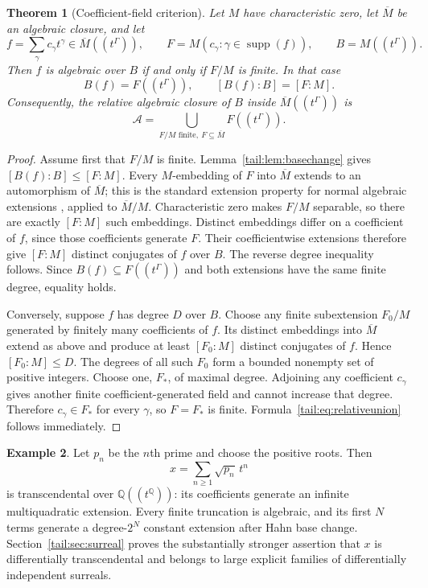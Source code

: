 \documentclass[11pt,a4paper]{article}
\numberwithin{equation}{section}
\newtheorem{theorem}{Theorem}[section]
\theoremstyle{definition}
\newtheorem{example}[theorem]{Example}
\theoremstyle{remark}
\newcommand{\Q}{\mathbb Q}
\newcommand{\supp}{\operatorname{supp}}
\begin{document}
\begin{theorem}[Coefficient-field criterion]\label{tail:thm:coefficient}
Let $M$ have characteristic zero, let $\overline M$ be an algebraic
closure, and let
\[
 f=\sum_\gamma c_\gamma t^\gamma\in\overline M((t^\Gamma)),
 \qquad F=M(c_\gamma:\gamma\in\supp(f)),
 \qquad B=M((t^\Gamma)).
\]
Then $f$ is algebraic over $B$ if and only if $F/M$ is finite. In that case
\begin{equation}\label{tail:eq:coeffdegree}
 B(f)=F((t^\Gamma)),\qquad [B(f):B]=[F:M].
\end{equation}
Consequently, the relative algebraic closure of $B$ inside
$\overline M((t^\Gamma))$ is
\begin{equation}\label{tail:eq:relativeunion}
 \mathcal A=\bigcup_{F/M\text{ finite},\ F\subseteq\overline M}
                  F((t^\Gamma)).
\end{equation}
\end{theorem}
\begin{proof}
Assume first that $F/M$ is finite. Lemma~\ref{tail:lem:basechange} gives
$[B(f):B]\leq[F:M]$. Every $M$-embedding of $F$ into $\overline M$ extends
to an automorphism of $\overline M$; this is the standard extension
property for normal algebraic extensions
\cite[Lemma~9.15.7(2)]{StacksNormal}, applied to $\overline M/M$.
Characteristic zero makes $F/M$ separable, so there are exactly $[F:M]$
such embeddings. Distinct embeddings differ on a coefficient of $f$,
since those coefficients generate $F$. Their coefficientwise extensions
therefore give $[F:M]$ distinct conjugates of $f$ over $B$. The reverse
degree inequality follows. Since $B(f)\subseteq F((t^\Gamma))$ and both
extensions have the same finite degree, equality holds.

Conversely, suppose $f$ has degree $D$ over $B$. Choose any finite
subextension $F_0/M$ generated by finitely many coefficients of $f$.
Its distinct embeddings into $\overline M$ extend as above and produce
at least $[F_0:M]$ distinct conjugates of $f$. Hence $[F_0:M]\leq D$.
The degrees of all such $F_0$ form a bounded nonempty set of positive
integers. Choose one, $F_*$, of maximal degree. Adjoining any coefficient
$c_\gamma$ gives another finite coefficient-generated field and cannot
increase that degree. Therefore $c_\gamma\in F_*$ for every $\gamma$,
so $F=F_*$ is finite. Formula~\eqref{tail:eq:relativeunion} follows immediately.
\end{proof}

\begin{example}
Let $p_n$ be the $n$th prime and choose the positive roots. Then
\[
 x=\sum_{n\geq1}\sqrt{p_n}\,t^n
\]
is transcendental over $\Q((t^\Q))$: its coefficients generate an
infinite multiquadratic extension. Every finite truncation is algebraic,
and its first $N$ terms generate a degree-$2^N$ constant extension after
Hahn base change. Section~\ref{tail:sec:surreal} proves the substantially
stronger assertion that $x$ is differentially transcendental and belongs
to large explicit families of differentially independent surreals.
\end{example}
\end{document}
